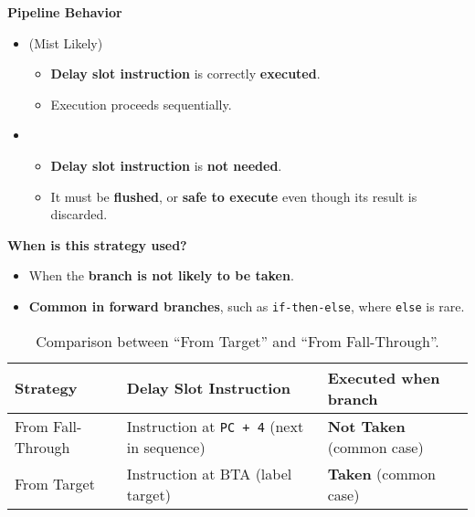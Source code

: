 \highspace
\begin{flushleft}
    \textcolor{Green3}{ \textbf{Pipeline Behavior}}
\end{flushleft}
\begin{itemize}
    \item {} (Mist Likely)
    \begin{itemize}
        \item \textbf{Delay slot instruction} is correctly \textbf{executed}.
        \item Execution proceeds sequentially.
    \end{itemize}
    
    \item {}
    \begin{itemize}
        \item \textbf{Delay slot instruction} is \textbf{not needed}.
        \item It must be \textbf{flushed}, or \textbf{safe to execute} even though its result is discarded.
    \end{itemize}
\end{itemize}

\highspace
\begin{flushleft}
    \textcolor{Green3}{ \textbf{When is this strategy used?}}
\end{flushleft}
\begin{itemize}[label=\textcolor{Green3}{}]
    \item When the \textbf{branch is not likely to be taken}.
    \item \textbf{Common in forward branches}, such as \texttt{if-then-else}, where \texttt{else} is rare.
\end{itemize}

\begin{table}[!htp]
    \begin{adjustbox}{width={\textwidth},totalheight={\textheight},keepaspectratio}
        \centering
        \begin{tabular}{@{} l l l @{}}
            \toprule
            Strategy & Delay Slot Instruction & Executed when branch \\
            \midrule
            From Fall-Through & Instruction at \texttt{PC + 4} (next in sequence)  & \textbf{Not Taken} (common case) \\
            From Target       & Instruction at BTA (label target)                  & \textbf{Taken} (common case)     \\
            \bottomrule
        \end{tabular}
    \end{adjustbox}
    \caption{Comparison between ``From Target'' and ``From Fall-Through''.}
\end{table}
